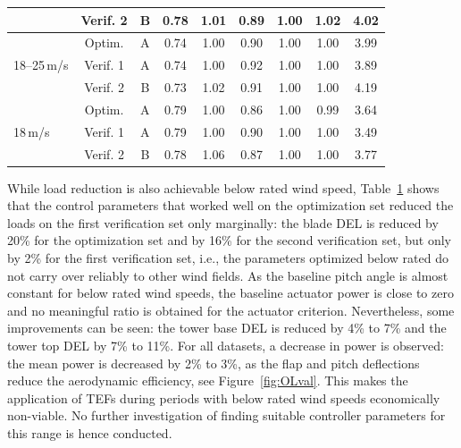 \begin{table}[h]
\begin{tabular}{@{}l*{8}{c}@{}}
        & Verif. 2 & B & 0.78 & 1.01 & 0.89 & 1.00 & 1.02 & 4.02 \\
        \midrule
        \multirow{3}{*}{18--25\,m/s} & Optim. & A & 0.74 & 1.00 & 0.90 & 1.00 & 1.00 & 3.99 \\
        & Verif. 1 & A & 0.74 & 1.00 & 0.92 & 1.00 & 1.00 & 3.89 \\
        & Verif. 2 & B & 0.73 & 1.02 & 0.91 & 1.00 & 1.00 & 4.19 \\
        \midrule
        \multirow{3}{*}{18\,m/s} & Optim. & A & 0.79 & 1.00 & 0.86 & 1.00 & 0.99 & 3.64 \\
        & Verif. 1 & A & 0.79 & 1.00 & 0.90 & 1.00 & 1.00 & 3.49 \\
        & Verif. 2 & B & 0.78 & 1.06 & 0.87 & 1.00 & 1.00 & 3.77 \\
        \bottomrule
    \end{tabular}
    \label{tabone}
\end{table}

While load reduction is also achievable below rated wind speed, Table~\ref{tabone} shows that the control parameters that worked well on the optimization set reduced the loads on the first verification set only marginally: the blade DEL is reduced by 20\% for the optimization set and by 16\% for the second verification set, but only by 2\% for the first verification set, i.e., the parameters optimized below rated do not carry over reliably to other wind fields. As the baseline pitch angle is almost constant for below rated wind speeds, the baseline actuator power is close to zero and no meaningful ratio is obtained for the actuator criterion. Nevertheless, some improvements can be seen: the tower base DEL is reduced by 4\% to 7\% and the tower top DEL by 7\% to 11\%. For all datasets, a decrease in power is observed: the mean power is decreased by 2\% to 3\%, as the flap and pitch deflections reduce the aerodynamic efficiency, see Figure~\ref{fig:OLval}. This makes the application of TEFs during periods with below rated wind speeds economically non-viable. No further investigation of finding suitable controller parameters for this range is hence conducted.

